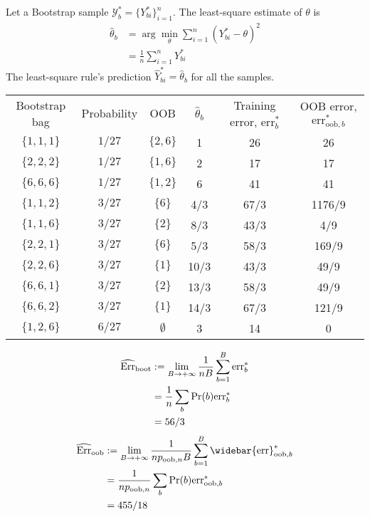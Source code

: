 \documentclass[10pt]{article}
\theoremstyle{definition}
\theoremstyle{remark}
\newcommand{\cY}{\mathcal{Y}}
\newcommand{\err}{\mathrm{err}}		%
\newcommand{\Err}{\mathrm{Err}}		%
\newcommand{\boot}{\mathrm{boot}}	%
\newcommand{\oob}{\mathrm{oob}}		%
\begin{document}
\begin{enumerate}
\begin{itemize}
		Let a Bootstrap sample $ \cY^{*}_{b} = \{Y_{bi}^{*}\}_{i=1}^{n}$.
		The least-square estimate of $\theta$ is
		\begin{align*}
		    \hat{\theta}_b & = \arg \min_{\theta} \sum_{i=1}^{n} (Y_{bi}^{*} - \theta)^2 \\
		    & = \frac{1}{n}\sum_{i=1}^{n} Y_{bi}^{*}
		\end{align*}
		The least-square rule's prediction $ \widehat{Y}_{bi}^{*} = \hat{\theta}_b $ for all the samples.
		
		\begin{tabular}{c|c|c|c|c|c}
		Bootstrap bag & Probability & OOB & $ \hat{\theta}_b$ & Training error, $\err_{b}^{*}$ & OOB error, $\err_{\oob,b}^{*}$  \\
		$\{1,1,1\}$ & $ 1/27 $ & $\{2,6\}$ & 1 & 26 & 26 \\
		$\{2,2,2\}$ & $ 1/27 $ & $\{1,6\}$ & 2 & 17 & 17 \\
		$\{6,6,6\}$ & $ 1/27 $ & $\{1,2\}$ & 6 & 41 & 41 \\
		$\{1,1,2\}$ & $ 3/27 $ & $\{6\}$ & 4/3 & 67/3 & 1176/9 \\
		$\{1,1,6\}$ & $ 3/27 $ & $\{2\}$ & 8/3 & 43/3 & 4/9 \\
		$\{2,2,1\}$ & $ 3/27 $ & $\{6\}$ & 5/3 & 58/3 & 169/9 \\
		$\{2,2,6\}$ & $ 3/27 $ & $\{1\}$ & 10/3 & 43/3 & 49/9 \\
		$\{6,6,1\}$ & $ 3/27 $ & $\{2\}$ & 13/3 & 58/3 & 49/9 \\
		$\{6,6,2\}$ & $ 3/27 $ & $\{1\}$ & 14/3 & 67/3 & 121/9 \\
		$\{1,2,6\}$ & $ 6/27 $ & $\emptyset$ & 3 & 14 & 0 \\
		\end{tabular}
		\begin{align*}
		    \widehat{\Err}_{\boot} & := \lim_{B\to+\infty}{1 \over nB}\sum_{b=1}^{B}\err_{b}^{*} \\
		    & = \frac{1}{n}\sum_{b} \Pr(b) \err_{b}^{*} \\
		    & = 56/3
		\end{align*}
		\begin{align*}
		    \widehat{\Err}_{\oob} & := \lim_{B\to+\infty}{1 \over np_{\oob,n}B}\sum_{b=1}^{B}\widebar{\err}_{\oob,b}^{*} \\
		    & = \frac{1}{np_{\oob,n}} \sum_{b} \Pr(b) \err_{\oob,b}^{*} \\
		    & = 455/18
		\end{align*}
		
		
		

\end{itemize}
\end{enumerate}
\end{document}

